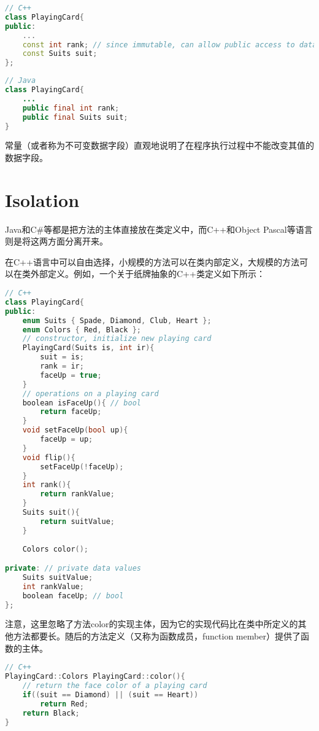 \begin{lstlisting}[language=C++]
// C++
class PlayingCard{
public:
	...
	const int rank; // since immutable, can allow public access to data field.
	const Suits suit;
};
\end{lstlisting}


\begin{lstlisting}[language=Java]
// Java
class PlayingCard{
	...
	public final int rank;
	public final Suits suit;
}
\end{lstlisting}


常量（或者称为不可变数据字段）直观地说明了在程序执行过程中不能改变其值的数据字段。





\section{Isolation}

Java和C\#等都是把方法的主体直接放在类定义中，而C++和Object Pascal等语言则是将这两方面分离开来。

在C++语言中可以自由选择，小规模的方法可以在类内部定义，大规模的方法可以在类外部定义。例如，一个关于纸牌抽象的C++类定义如下所示：

\begin{lstlisting}[language=C++]
// C++ 
class PlayingCard{
public:
	enum Suits { Spade, Diamond, Club, Heart };
	enum Colors { Red, Black };
	// constructor, initialize new playing card
	PlayingCard(Suits is, int ir){
		suit = is;
		rank = ir;
		faceUp = true;
	}
	// operations on a playing card
	boolean isFaceUp(){ // bool
		return faceUp;
	}
	void setFaceUp(bool up){
		faceUp = up;
	}
	void flip(){
		setFaceUp(!faceUp);
	}
	int rank(){
		return rankValue;
	}
	Suits suit(){
		return suitValue;
	}
	
	Colors color();

private: // private data values
	Suits suitValue;
	int rankValue;
	boolean faceUp; // bool
};
\end{lstlisting}

注意，这里忽略了方法color的实现主体，因为它的实现代码比在类中所定义的其他方法都要长。随后的方法定义（又称为函数成员，function member）提供了函数的主体。


\begin{lstlisting}[language=C++]
// C++
PlayingCard::Colors PlayingCard::color(){
	// return the face color of a playing card
	if((suit == Diamond) || (suit == Heart))
		return Red;
	return Black;
}
\end{lstlisting}

